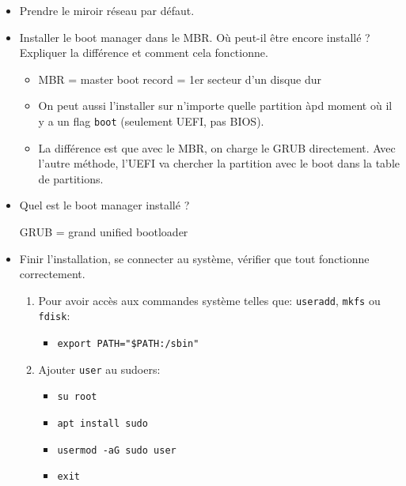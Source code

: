 \documentclass[a4paper]{article}
\begin{document}
\begin{itemize}
\item Prendre le miroir réseau par défaut.

\item Installer le boot manager dans le MBR. Où peut-il être encore installé ? Expliquer la différence et comment cela fonctionne.
\begin{example}
    \begin{itemize}
        \item MBR = master boot record = 1er secteur d'un disque dur
        \item On peut aussi l'installer sur n'importe quelle partition àpd moment où il y a un flag \texttt{boot} (seulement UEFI, pas BIOS).
        \item La différence est que avec le MBR, on charge le GRUB directement. Avec l'autre méthode, l'UEFI va chercher la partition avec le boot dans la table de partitions.
    \end{itemize}
\end{example}

\item Quel est le boot manager installé ?
\begin{example}
    GRUB = grand unified bootloader
\end{example}

\item Finir l'installation, se connecter au système, vérifier que tout fonctionne correctement.
\begin{example}
    \begin{enumerate}
        \item Pour avoir accès aux commandes système telles que: \texttt{useradd}, \texttt{mkfs} ou \texttt{fdisk}:
        \begin{itemize}
            \item \texttt{export PATH="\$PATH:/sbin"}
        \end{itemize}
        \item Ajouter \texttt{user} au sudoers:
        \begin{itemize}
            \item \texttt{su root}
            \item \texttt{apt install sudo}
            \item \texttt{usermod -aG sudo user}
            \item \texttt{exit}
        \end{itemize}
    \end{enumerate}
\end{example}

\end{itemize}
\end{document}
